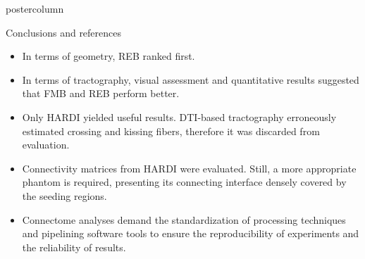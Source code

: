 \documentclass[final,hyperref={pdfpagelabels=false}]{beamer}
\newlength{\columnheight}
\begin{document}
\begin{frame}[t]
{\begin{minipage}[t][\columnheight][c]{0.95\textwidth}
{\begin{columns}[T,totalwidth=\textwidth]
    \begin{column}{.64\textwidth}
      \begin{beamercolorbox}[center,wd=\textwidth]{postercolumn}
        \begin{minipage}[T]{.95\textwidth} %
          \parbox[t]{\textwidth}{ %
          \begin{block}{Conclusions and references}
            \begin{itemize}
              \item In terms of geometry, REB ranked first.
              \item In terms of tractography, visual assessment and
                    quantitative results suggested that FMB and REB perform better.
              \item Only HARDI yielded useful results. DTI-based tractography erroneously
                    estimated crossing and kissing fibers, therefore it was discarded
                    from evaluation.
              \item Connectivity matrices from HARDI were evaluated. Still, a more appropriate
                    phantom is required, presenting its connecting interface
                    densely covered by the seeding regions.
              \item Connectome analyses demand the standardization of
                    processing techniques and pipelining software tools to
                    ensure the reproducibility of experiments and the 
                    reliability of results.
            \end{itemize}


\end{block}}
\end{minipage}
\end{beamercolorbox}
\end{column}
\end{columns}}
\end{minipage}}
\end{frame}
\end{document}
